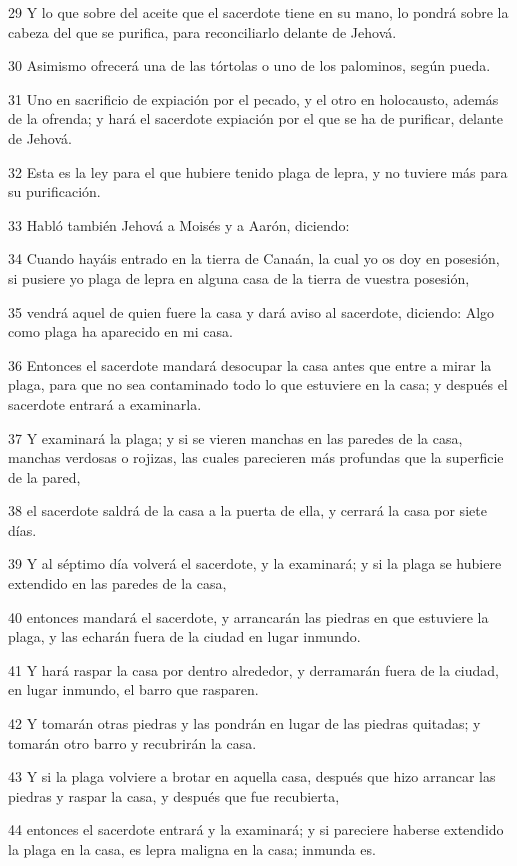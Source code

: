 \par 29 Y lo que sobre del aceite que el sacerdote tiene en su mano, lo pondrá sobre la cabeza del que se purifica, para reconciliarlo delante de Jehová.
\par 30 Asimismo ofrecerá una de las tórtolas o uno de los palominos, según pueda.
\par 31 Uno en sacrificio de expiación por el pecado, y el otro en holocausto, además de la ofrenda; y hará el sacerdote expiación por el que se ha de purificar, delante de Jehová.
\par 32 Esta es la ley para el que hubiere tenido plaga de lepra, y no tuviere más para su purificación.
\par 33 Habló también Jehová a Moisés y a Aarón, diciendo:
\par 34 Cuando hayáis entrado en la tierra de Canaán, la cual yo os doy en posesión, si pusiere yo plaga de lepra en alguna casa de la tierra de vuestra posesión,
\par 35 vendrá aquel de quien fuere la casa y dará aviso al sacerdote, diciendo: Algo como plaga ha aparecido en mi casa.
\par 36 Entonces el sacerdote mandará desocupar la casa antes que entre a mirar la plaga, para que no sea contaminado todo lo que estuviere en la casa; y después el sacerdote entrará a examinarla.
\par 37 Y examinará la plaga; y si se vieren manchas en las paredes de la casa, manchas verdosas o rojizas, las cuales parecieren más profundas que la superficie de la pared,
\par 38 el sacerdote saldrá de la casa a la puerta de ella, y cerrará la casa por siete días.
\par 39 Y al séptimo día volverá el sacerdote, y la examinará; y si la plaga se hubiere extendido en las paredes de la casa,
\par 40 entonces mandará el sacerdote, y arrancarán las piedras en que estuviere la plaga, y las echarán fuera de la ciudad en lugar inmundo.
\par 41 Y hará raspar la casa por dentro alrededor, y derramarán fuera de la ciudad, en lugar inmundo, el barro que rasparen.
\par 42 Y tomarán otras piedras y las pondrán en lugar de las piedras quitadas; y tomarán otro barro y recubrirán la casa.
\par 43 Y si la plaga volviere a brotar en aquella casa, después que hizo arrancar las piedras y raspar la casa, y después que fue recubierta,
\par 44 entonces el sacerdote entrará y la examinará; y si pareciere haberse extendido la plaga en la casa, es lepra maligna en la casa; inmunda es.

